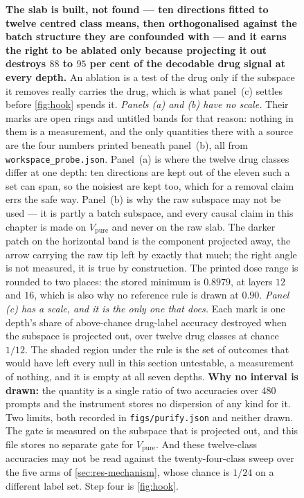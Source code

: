 \begin{figure}[htbp]
\begin{fullwidth}
\centering

\caption[The drug slab and its removal gate]{\textbf{The slab is built, not
found --- ten directions fitted to twelve centred class means, then
orthogonalised against the batch structure they are confounded with --- and it
earns the right to be ablated only because projecting it out destroys $88$ to
$95$ per cent of the decodable drug signal at every depth.} An ablation is a
test of the drug only if the subspace it removes really carries the drug, which
is what panel~(c) settles before \cref{fig:hook} spends it.
\emph{Panels (a) and (b) have no scale.} Their marks are open rings and
untitled bands for that reason: nothing in them is a measurement, and the only
quantities there with a source are the four numbers printed beneath panel~(b),
all from \texttt{workspace\_probe.json}. Panel~(a) is where the twelve drug
classes differ at one depth: ten directions are kept out of the eleven such a
set can span, so the noisiest are kept too, which for a removal claim errs the
safe way. Panel~(b) is why the raw subspace may not be used --- it is partly a
batch subspace, and every causal claim in this chapter is made on
$V_{\textrm{pure}}$ and never on the raw slab. The darker patch on the
horizontal band is the component projected away, the arrow carrying the raw tip
left by exactly that much; the right angle is not measured, it is true by
construction. The printed dose range is rounded to two places: the stored
minimum is $0.8979$, at layers $12$ and $16$, which is also why no reference
rule is drawn at $0.90$.
\emph{Panel (c) has a scale, and it is the only one that does.} Each mark is
one depth's share of above-chance drug-label accuracy destroyed when the
subspace is projected out, over twelve drug classes at chance $1/12$. The
shaded region under the rule is the set of outcomes that would have left every
null in this section untestable, a measurement of nothing, and it is empty at
all seven depths. \textbf{Why no interval is drawn:} the quantity is a single
ratio of two accuracies over \num{480} prompts and the instrument stores no
dispersion of any kind for it. Two limits, both recorded in
\texttt{figs/purify.json} and neither drawn. The gate is measured on the
subspace that is projected out, and this file stores no separate gate for
$V_{\textrm{pure}}$. And these twelve-class accuracies may not be read against
the twenty-four-class sweep over the five arms of \cref{sec:res-mechanism},
whose chance is $1/24$ on a different label set. Step four is \cref{fig:hook}.}
\label{fig:purify}
\end{fullwidth}
\end{figure}

